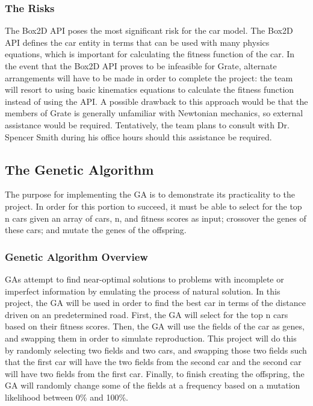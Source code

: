 \documentclass{article}
\begin{document}
\subsubsection{The Risks}
The Box2D API poses the most significant risk for the car model. The Box2D API 
defines the car entity in terms that can be used with many physics equations, 
which is important for calculating the fitness function of the car. In the event 
that the Box2D API \textcolor{RoyalPurple}{proves} to be infeasible for Grate, 
alternate \textcolor{RoyalPurple}{arrangements}
will have to be made in order to complete the project: the team will resort to 
using basic kinematics equations to calculate the fitness function instead of 
using the API. A possible drawback to this approach would be that the members of 
Grate is generally unfamiliar with Newtonian mechanics, so external assistance 
would be required. Tentatively, the team plans to consult with Dr. Spencer Smith 
during his office hours should this assistance be required.

\subsection{The Genetic Algorithm}
The purpose for implementing the GA is to demonstrate its practicality to 
the project. In order for this portion to succeed, it must be able to select for 
the top n cars given an array of cars, n, and fitness scores as input; crossover 
the genes of these cars; and mutate the genes of the offspring.

\subsubsection{Genetic Algorithm Overview}
GAs attempt to find near-optimal solutions to problems with incomplete or 
imperfect information by emulating the process of natural solution. In this 
project, the GA will be used in order to find the best car in terms of the 
distance driven on an predetermined road. First, the GA will select for the top 
n cars based on their fitness scores. Then, the GA will use the fields of the 
car as genes, and swapping them in order to simulate reproduction. This project 
will do this by randomly selecting two fields and two cars, and swapping those 
two fields such that the first car will have the two fields from the second car 
and the second car will have two fields from the first car. Finally, to finish 
creating the offspring, the GA will randomly change some of the fields at a 
frequency based on a mutation likelihood between 0\% and 100\%. 
\end{document}
